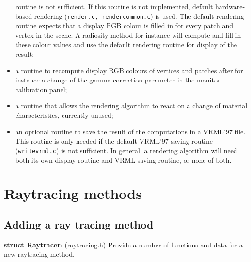 \documentclass[11pt]{report}
\begin{document}
\begin{itemize}
	routine is not sufficient. If this routine is not implemented, default
	hardware-based rendering ({\tt render.c, rendercommon.c}) is used. The
	default rendering routine expects that a display RGB colour is filled in
	for every patch and vertex in the scene. A radiosity method for instance
	will compute and fill in these colour values and use the default rendering
	routine for display of the result;
\item	a routine to recompute display RGB colours of vertices and patches after 
	for instance a change of the gamma correction parameter in the monitor
	calibration panel;
\item	a routine that allows the rendering algorithm to react on a change of
	material characteristics, currently unused;
\item	an optional routine to save the result of the computations in a VRML'97
	file. This routine is only needed if the default VRML'97 saving 
	routine ({\tt writevrml.c}) is not sufficient. In general, a rendering
	algorithm will need both its own display routine and VRML saving routine,
	or none of both.
\end{itemize}


\chapter{Raytracing methods}
\label{raytracing-methods}


\section{Adding a ray tracing method}

{\bf struct Raytracer}: (raytracing.h) Provide a number
of functions and data for a new raytracing method.
\end{document}
